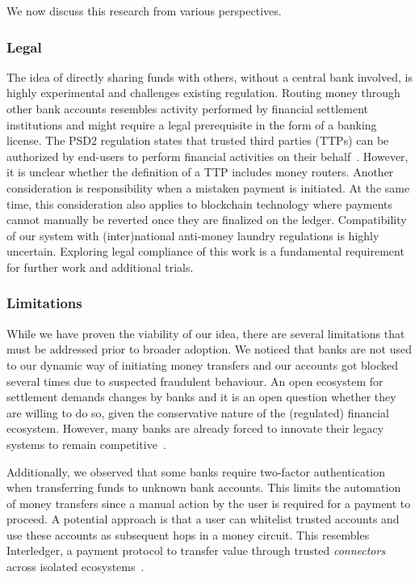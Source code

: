 We now discuss this research from various perspectives.

\subsubsection*{Legal}
The idea of directly sharing funds with others, without a central bank involved, is highly experimental and challenges existing regulation.
Routing money through other bank accounts resembles activity performed by financial settlement institutions and might require a legal prerequisite in the form of a banking license.
The PSD2 regulation states that trusted third parties (TTPs) can be authorized by end-users to perform financial activities on their behalf~\cite{cortet2016psd2}.
However, it is unclear whether the definition of a TTP includes money routers.
Another consideration is responsibility when a mistaken payment is initiated.
At the same time, this consideration also applies to blockchain technology where payments cannot manually be reverted once they are finalized on the ledger.
Compatibility of our system with (inter)national anti-money laundry regulations is highly uncertain.
Exploring legal compliance of this work is a fundamental requirement for further work and additional trials.

\subsubsection*{Limitations}
While we have proven the viability of our idea, there are several limitations that must be addressed prior to broader adoption.
We noticed that banks are not used to our dynamic way of initiating money transfers and our accounts got blocked several times due to suspected fraudulent behaviour.
An open ecosystem for settlement demands changes by banks and it is an open question whether they are willing to do so, given the conservative nature of the (regulated) financial ecosystem.
However, many banks are already forced to innovate their legacy systems to remain competitive~\cite{mckinsey2016payments}.

Additionally, we observed that some banks require two-factor authentication when transferring funds to unknown bank accounts.
This limits the automation of money transfers since a manual action by the user is required for a payment to proceed.
A potential approach is that a user can whitelist trusted accounts and use these accounts as subsequent hops in a money circuit.
This resembles Interledger, a payment protocol to transfer value through trusted \emph{connectors} across isolated ecosystems~\cite{thomas2015protocol}.


